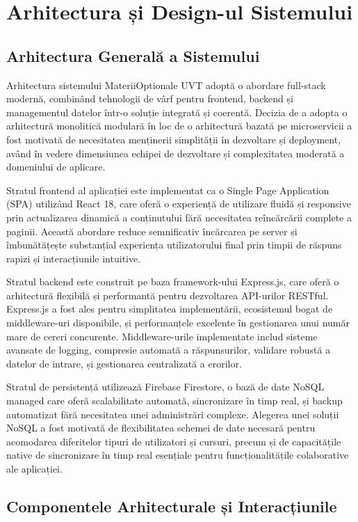 \documentclass[12pt,a4paper]{report}
\begin{document}
\chapter{Arhitectura și Design-ul Sistemului}

\section{Arhitectura Generală a Sistemului}

Arhitectura sistemului MateriiOptionale UVT adoptă o abordare full-stack modernă, combinând tehnologii de vârf pentru frontend, backend și managementul datelor într-o soluție integrată și coerentă. Decizia de a adopta o arhitectură monolitică modulară în loc de o arhitectură bazată pe microservicii a fost motivată de necesitatea menținerii simplității în dezvoltare și deployment, având în vedere dimensiunea echipei de dezvoltare și complexitatea moderată a domeniului de aplicare.

Stratul frontend al aplicației este implementat ca o Single Page Application (SPA) utilizând React 18, care oferă o experiență de utilizare fluidă și responsive prin actualizarea dinamică a conținutului fără necesitatea reîncărcării complete a paginii. Această abordare reduce semnificativ încărcarea pe server și îmbunătățește substanțial experiența utilizatorului final prin timpii de răspuns rapizi și interacțiunile intuitive.

Stratul backend este construit pe baza framework-ului Express.js, care oferă o arhitectură flexibilă și performantă pentru dezvoltarea API-urilor RESTful. Express.js a fost ales pentru simplitatea implementării, ecosistemul bogat de middleware-uri disponibile, și performanțele excelente în gestionarea unui număr mare de cereri concurente. Middleware-urile implementate includ sisteme avansate de logging, compresie automată a răspunsurilor, validare robustă a datelor de intrare, și gestionarea centralizată a erorilor.

Stratul de persistență utilizează Firebase Firestore, o bază de date NoSQL managed care oferă scalabilitate automată, sincronizare în timp real, și backup automatizat fără necesitatea unei administrări complexe. Alegerea unei soluții NoSQL a fost motivată de flexibilitatea schemei de date necesară pentru acomodarea diferitelor tipuri de utilizatori și cursuri, precum și de capacitățile native de sincronizare în timp real esențiale pentru funcționalitățile colaborative ale aplicației.

\section{Componentele Arhitecturale și Interacțiunile}
\end{document}
